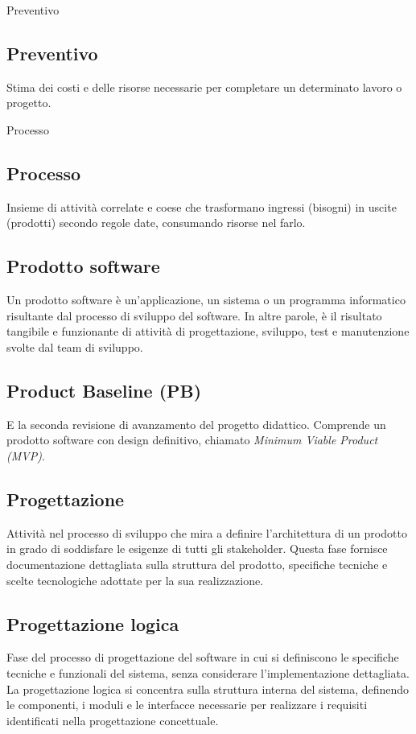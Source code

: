 \hypertarget{sec:preventivo}{Preventivo}
\subsection*{Preventivo}
Stima dei costi e delle risorse necessarie per completare un determinato lavoro o progetto.

\hypertarget{sec:processo}{Processo}
\subsection*{Processo}
Insieme di attività correlate e coese che trasformano ingressi (bisogni) in uscite (prodotti) secondo regole date,
consumando risorse nel farlo.

\hypertarget{sec:prodotto_software}{}
\subsection*{Prodotto software}
Un prodotto software è un’applicazione, un sistema o un programma
informatico risultante dal processo di sviluppo del software. In altre parole, è il risultato
tangibile e funzionante di attività di progettazione, sviluppo, test e manutenzione svolte dal
team di sviluppo.

\hypertarget{sec:PB}{}
\subsection*{Product Baseline (PB)}
E la seconda revisione di avanzamento del progetto didattico. Comprende un prodotto software con design definitivo, 
chiamato \emph{Minimum Viable Product (MVP)}.

\hypertarget{sec:progettazione}{}
\subsection*{Progettazione}
Attività nel processo di sviluppo che mira a definire l'architettura di un prodotto in grado di soddisfare le esigenze di tutti gli stakeholder. 
Questa fase fornisce documentazione dettagliata sulla struttura del prodotto, specifiche tecniche e scelte tecnologiche adottate per la sua realizzazione.

\hypertarget{sec:progettazione_logica}{}
\subsection*{Progettazione logica}
Fase del processo di progettazione del software in cui si definiscono le specifiche tecniche e funzionali del sistema, senza considerare l'implementazione
dettagliata. La progettazione logica si concentra sulla struttura interna del sistema, definendo le componenti, i moduli e le interfacce necessarie per
realizzare i requisiti identificati nella progettazione concettuale.

